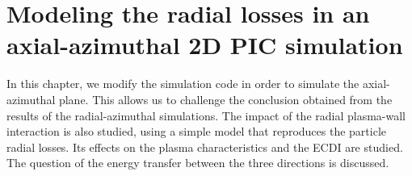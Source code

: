



\chapter{Modeling the radial losses in an axial-azimuthal 2D PIC simulation}
\label{ch-6}


\begin{Chabstract}
  In this chapter, we modify the simulation code \LPPic in order to simulate the axial-azimuthal plane.
  This allows us to challenge the conclusion obtained from the results of the radial-azimuthal simulations.
  The impact of the radial plasma-wall interaction is also studied, using a simple model that reproduces the particle radial losses.
  Its effects on the plasma characteristics and the \ac{ECDI} are studied.
  The question of the energy transfer between the three directions is discussed.
\end{Chabstract}

\renewcommand\subfigurewidth{0.45\textwidth}

% 
% 

\minitoc



% 




